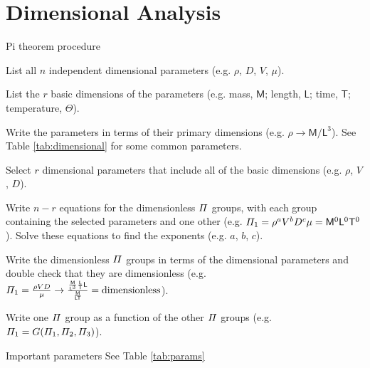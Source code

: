 \documentclass{article}
\begin{document}
\section{Dimensional Analysis}
\begin{description*}
\item[Pi theorem procedure]~
  \begin{enumerate*}
  \item List all $n$ independent dimensional parameters (e.g. $\rho$, $D$, $V$, $\mu$).
  \item List the $r$ basic dimensions of the parameters (e.g. mass, $\mathsf{M}$; length,
    $\mathsf{L}$; time, $\mathsf{T}$; temperature, $\mathsf{\Theta}$).
  \item Write the parameters in terms of their primary dimensions (e.g. $\rho\rightarrow
    \mathsf{M}/\mathsf{L}^3$).  See Table \ref{tab:dimensional} for some common parameters.
  \item Select $r$ dimensional parameters that include all of the basic dimensions
    (e.g. $\rho$, $V$, $D$).
  \item Write $n-r$ equations for the dimensionless $\mathnormal\Pi$ groups, with each group
    containing the selected parameters and one other (e.g.
    \(\mathnormal\Pi_1 = \rho^aV^bD^c\mu = \mathsf{M}^0\mathsf{L}^0\mathsf{T}^0\)).
    Solve these equations to find the exponents (e.g. $a$, $b$, $c$).
  \item Write the dimensionless $\mathnormal\Pi$ groups in terms of the dimensional parameters and
    double check that they are dimensionless (e.g. \(\mathnormal\Pi_1 = \frac{\rho{}VD}{\mu}
    \rightarrow \frac{\frac{\mathsf{M}}{\mathsf{L}^3}\frac{\mathsf{L}}{\mathsf{T}}\mathsf{L}}
                     {\frac{\mathsf{M}}{\mathsf{L}\mathsf{T}}}
    = \textrm{dimensionless}\)).
  \item Write one $\mathnormal\Pi$ group as a function of the other $\mathnormal\Pi$ groups
    (e.g. \(\mathnormal\Pi_1 = G(\mathnormal\Pi_1,\mathnormal\Pi_2,\mathnormal\Pi_3)\)).
  \end{enumerate*}
\item[Important parameters] See Table \ref{tab:params}
\end{description*}
\end{document}
